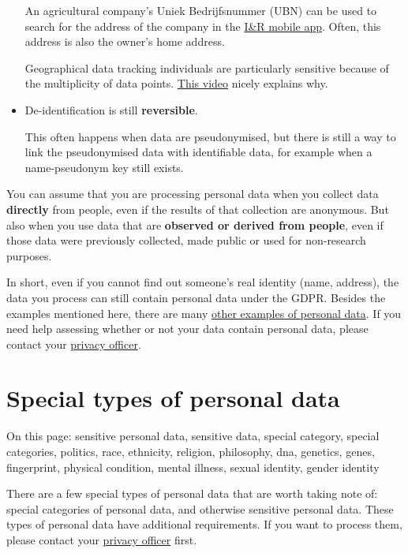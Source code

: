 \documentclass[
]{book}
\begin{document}
\begin{itemize}
  An agricultural company's Uniek Bedrijfsnummer (UBN) can be used to
  search for the address of the company in the
  \href{https://www.rvo.nl/onderwerpen/identificatie-en-registratie-dieren/app-ir-dieren}{I\&R mobile app}.
  Often, this address is also the owner's home address.

  Geographical data tracking individuals are particularly sensitive
  because of the multiplicity of data points.
  \href{https://www.youtube.com/watch?v=Pivd71NYKDA}{This video}
  nicely explains why.
\item
  De-identification is still \textbf{reversible}.

  This often happens when data are pseudonymised, but there is still a way
  to link the pseudonymised data with identifiable data, for example when a
  name-pseudonym key still exists.
\end{itemize}

You can assume that you are processing personal data when you collect data
\textbf{directly} from people, even if the results of that collection are anonymous. But
also when you use data that are \textbf{observed or derived from people}, even if those
data were previously collected, made public or used for non-research purposes.

In short, even if you cannot find out someone's real identity (name, address),
the data you process can still contain personal data under the GDPR. Besides
the examples mentioned here, there are many
\href{https://intranet.uu.nl/system/files/documenten/categories-of-personal-information-en.pdf}{other examples of personal data}.
If you need help assessing whether or not your data contain personal data,
please contact your \protect\hyperlink{support}{privacy officer}.

\hypertarget{special-types-personal-data}{%
\section{Special types of personal data}\label{special-types-personal-data}}

On this page: sensitive personal data, sensitive data, special category, special
categories, politics, race, ethnicity, religion, philosophy, dna,
genetics, genes, fingerprint, physical condition, mental illness, sexual
identity, gender identity

There are a few special types of personal data that are worth taking note of:
special categories of personal data, and otherwise sensitive personal data.
These types of personal data have additional requirements. If you want to
process them, please contact your \protect\hyperlink{support}{privacy officer} first.
\end{document}
